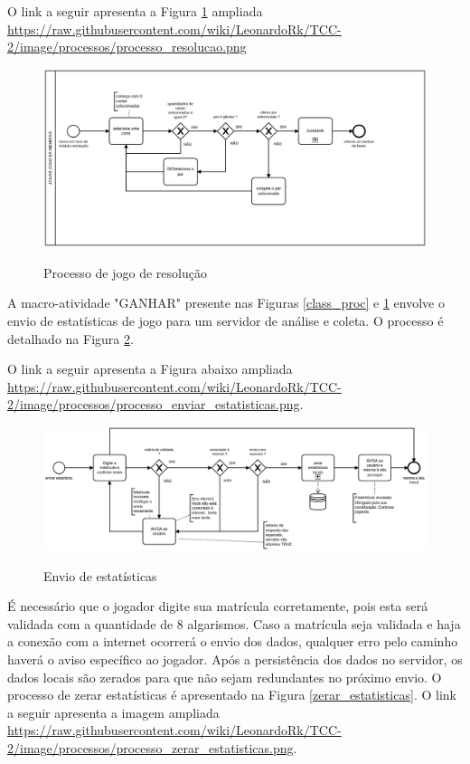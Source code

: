 O link a seguir apresenta a Figura \ref{res_proc} ampliada \url{https://raw.githubusercontent.com/wiki/LeonardoRk/TCC-2/image/processos/processo_resolucao.png}
\begin{figure}[H]
\centering
\caption{Processo de jogo de resolução}
\includegraphics[width=\textwidth,height=\textheight,keepaspectratio]{figuras/processos/processo_resolucao.png}
\label{res_proc}
\end{figure}

A macro-atividade "GANHAR" presente nas Figuras \ref{class_proc} e \ref{res_proc} envolve o envio de estatísticas de jogo para um servidor de análise e coleta. O processo é detalhado na Figura \ref{envio_estatisticas}.  

O link a seguir apresenta a Figura abaixo ampliada \url{https://raw.githubusercontent.com/wiki/LeonardoRk/TCC-2/image/processos/processo_enviar_estatisticas.png}.

\begin{figure}[H]
\centering
\caption{Envio de estatísticas}
\includegraphics[width=\textwidth,height=\textheight,keepaspectratio]{figuras/processos/processo_enviar_estatisticas.png}
\label{envio_estatisticas}
\end{figure}

É necessário que o jogador digite sua matrícula corretamente, pois esta será validada com a quantidade de 8 algarismos. Caso a matrícula seja validada e haja a conexão com a internet ocorrerá o envio dos dados, qualquer erro pelo caminho haverá o aviso específico ao jogador. Após a persistência dos dados no servidor, os dados locais são zerados para que não sejam redundantes no próximo envio. O processo de zerar estatísticas é apresentado na Figura \ref{zerar_estatisticas}. O link a seguir apresenta a imagem ampliada \url{https://raw.githubusercontent.com/wiki/LeonardoRk/TCC-2/image/processos/processo_zerar_estatisticas.png}. 

